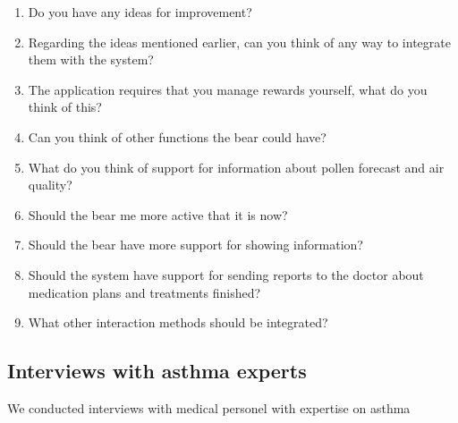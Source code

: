 \begin{enumerate}
	\item{Do you have any ideas for improvement?}
	\item{Regarding the ideas mentioned earlier, can you think of any way to integrate them with the system?}
	\item{The application requires that you manage rewards yourself, what do you think of this?}
	\item{Can you think of other functions the bear could have?}
	\item{What do you think of support for information about pollen forecast and air quality?}
	\item{Should the bear me more active that it is now?}
	\item{Should the bear have more support for showing information?}
	\item{Should the system have support for sending reports to the doctor about medication plans and treatments finished?}
	\item{What other interaction methods should be integrated?}
\end{enumerate}


\subsection{Interviews with asthma experts}

We conducted interviews with medical personel with expertise on asthma